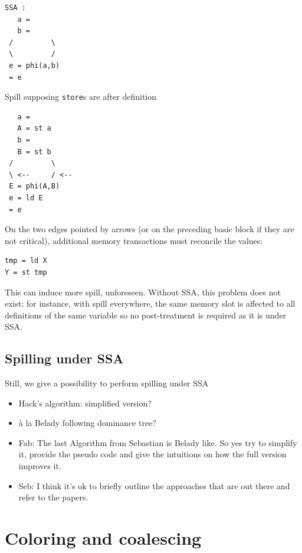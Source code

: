 {\begin{minipage}{.45\textwidth}
\begin{verbatim}
SSA :
   a =
   b =
 /         \
 \         /
 e = phi(a,b)
 = e
\end{verbatim}
\end{minipage}
\begin{minipage}{.45\textwidth}
Spill supposing {\tt store}s are after definition
\begin{verbatim}
   a =
   A = st a
   b =
   B = st b
 /         \
 \ <--     / <--
 E = phi(A,B)
 e = ld E
 = e
\end{verbatim}
\end{minipage}

On the two edges pointed by arrows (or on the preceding basic block if they are 
not critical), additional memory transactions must reconcile the values:
\begin{verbatim}
tmp = ld X
Y = st tmp
\end{verbatim}

This can induce more spill, unforeseen.
Without SSA, this problem does not exist: for instance, with spill everywhere, 
the same memory slot is affected to all definitions of the same variable so no 
post-treatment is required as it is under SSA.



\subsection{Spilling under SSA}
Still, we give a possibility to perform spilling under SSA
\begin{itemize}
  \item Hack's algorithm: simplified version?
  \item \`a la Belady following dominance tree?

  \item Fab: The last Algorithm from Sebastian is Belady like. So yes try to simplify it, provide the pseudo code and give the intuitions on how the full version improves it.
  \item Seb: I think it's ok to briefly outline the approaches that are out there and refer to the papers.

\end{itemize}


\cite{Braun09:spilling-ssa}


\section{Coloring and coalescing}
}
